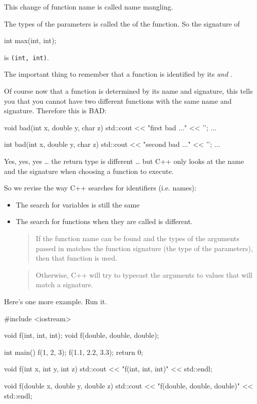 This change of function name is called name mangling.

The types of the parameters is called the  of the function. So the signature of

\begin{consolethree}[escapeinside=||]
int max(int, int);
\end{consolethree}

is \texttt{(int, int)}.

The important thing to remember that a function is identified by its  \textit{and} .

Of course now that a function is determined by its name and signature, this tells you that you cannot have two different functions with the same name and signature. Therefore this is BAD:

\begin{consolethree}[escapeinside=||]
void bad(int x, double y, char z)
{
    std::cout << "first bad ..." << '\n';
    ...
}

int bad(int x, double y, char z)
{
    std::cout << "second bad ..." << '\n';
    ...
}
\end{consolethree}

Yes, yes, yes \ldots{} the return type is different \ldots{} but C++ only looks at the name and the signature when choosing a function to execute.

So we revise the way C++ searches for identifiers (i.e. names):

\begin{itemize}
\item The search for variables is still the same
\item The search for functions when they are called is different.
  \begin{quote}
  If the function name can be found and the types of the arguments
  passed in matches the function signature (the type of the parameters),
  then that function is used.
  \end{quote}
  \begin{quote}
  Otherwise, C++ will try to typecast the arguments to values that will
  match a signature.
  \end{quote}
\end{itemize}

Here's one more example. Run it.

\begin{consolethree}[escapeinside=||]
#include <iostream>

void f(int, int, int);
void f(double, double, double);

int main()
{
    f(1, 2, 3);
    f(1.1, 2.2, 3.3);
    return 0;
}

void f(int x, int y, int z)
{
    std::cout << "f(int, int, int)" << std::endl;
}

void f(double x, double y, double z)
{
    std::cout << "f(double, double, double)"
              << std::endl;
}
\end{consolethree}

